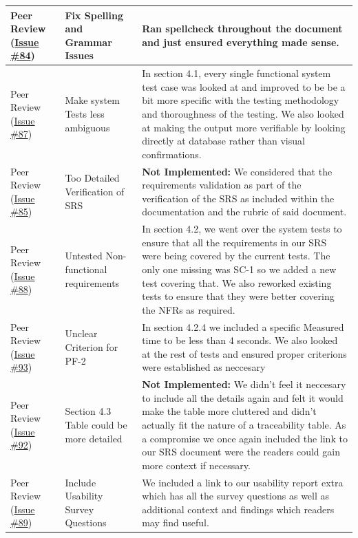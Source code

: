 \documentclass{article}
\begin{document}
\begin{longtable}{|>{\raggedright\arraybackslash}p{}|>{\raggedright\arraybackslash}p{}|>{\raggedright\arraybackslash}p{}|}
\hline
\endlastfoot
Peer Review (\href{https://github.com/VirochaanRG/MES-Event-Management-System/issues/84}{Issue \#84}) & Fix Spelling and Grammar Issues & Ran spellcheck throughout the document and just ensured everything made sense.\\
\hline
Peer Review (\href{https://github.com/VirochaanRG/MES-Event-Management-System/issues/87}{Issue \#87}) & Make system Tests less ambiguous & In section 4.1, every single functional system test case was looked at and improved to be be a bit more specific with the testing methodology and thoroughness of the testing. We also looked at making the output more verifiable by looking directly at database rather than visual confirmations.\\
\hline
Peer Review (\href{https://github.com/VirochaanRG/MES-Event-Management-System/issues/85}{Issue \#85}) & Too Detailed Verification of SRS& \textbf{Not Implemented:} We considered that the requirements validation as part of the verification of the SRS as included within the documentation and the rubric of said document.\\
\hline
Peer Review (\href{https://github.com/VirochaanRG/MES-Event-Management-System/issues/88}{Issue \#88}) & Untested Non-functional requirements& In section 4.2, we went over the system tests to ensure that all the requirements in our SRS were being covered by the current tests. The only one missing was SC-1 so we added a new test covering that. We also reworked existing tests to ensure that they were better covering the NFRs as required.\\
\hline
Peer Review (\href{https://github.com/VirochaanRG/MES-Event-Management-System/issues/93}{Issue \#93}) & Unclear Criterion for PF-2 & In section 4.2.4 we included a specific Measured time to be less than 4 seconds. We also looked at the rest of tests and ensured proper criterions were established as neccesary\\
\hline
Peer Review (\href{https://github.com/VirochaanRG/MES-Event-Management-System/issues/92}{Issue \#92}) & Section 4.3 Table could be more detailed & \textbf{Not Implemented:} We didn't feel it neccesary to include all the details again and felt it would make the table more cluttered and didn't actually fit the nature of a traceability table. As a compromise we once again included the link to our SRS document were the readers could gain more context if necessary.\\
\hline
Peer Review (\href{https://github.com/VirochaanRG/MES-Event-Management-System/issues/89}{Issue \#89}) & Include Usability Survey Questions & We included a link to our usability report extra which has all the survey questions as well as additional context and findings which readers may find useful. \\

\end{longtable}
\end{document}
